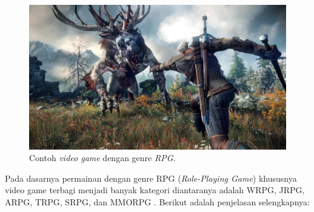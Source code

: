 \begin{figure} [!h] \centering
	\includegraphics[scale=0.20]{img/whitcher.jpg}
	\caption{Contoh \textit{video game} dengan genre \textit{RPG}.}
	\label{fig:action_rpg}
\end{figure}
\vspace{1ex}

Pada dasarnya permainan dengan genre RPG (\textit{Role-Playing Game}) khususnya video game terbagi menjadi banyak kategori diantaranya adalah WRPG, JRPG, ARPG, TRPG, SRPG, dan MMORPG \citep{stenstrom2012}. Berikut adalah penjelasan selengkapnya:
\vspace{1ex}


